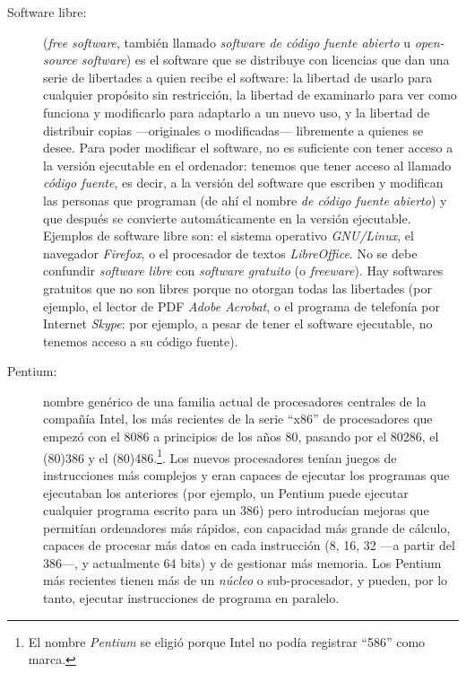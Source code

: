 \begin{description}
\item[Software libre:] (\emph{free software}, también llamado \emph{software de código fuente abierto} u \emph{open-source software}) es el software que se distribuye con licencias que dan una serie de libertades a quien recibe el software: la libertad de usarlo para cualquier propósito sin restricción, la libertad de examinarlo para ver como funciona y modificarlo para adaptarlo a un nuevo uso, y la libertad de distribuir copias ---originales o modificadas--- libremente a quienes se desee. Para poder modificar el software, no es suficiente con tener acceso a la versión ejecutable en el ordenador: tenemos que tener acceso al llamado \emph{código fuente}, es decir, a la versión del software que escriben y modifican las personas que programan (de ahí el nombre \emph{de código fuente abierto}) y que después se convierte automáticamente en la versión ejecutable. Ejemplos de software libre son: el sistema operativo \emph{GNU/Linux}, el navegador \emph{Firefox}, o el procesador de textos \emph{LibreOffice}. No se debe confundir \emph{software libre} con \emph{software gratuito} (o \emph{freeware}). Hay softwares gratuitos que no son libres porque no otorgan todas las libertades (por ejemplo, el lector de PDF \emph{Adobe Acrobat}, o el programa de telefonía por Internet \emph{Skype}: por ejemplo, a pesar de tener el software ejecutable, no tenemos acceso a su código fuente). 

\item[Pentium:] nombre genérico de una familia actual de procesadores centrales de la compañía Intel, los más recientes de la serie ``x86'' de procesadores que empezó con el 8086 a principios de los años 80, pasando por el 80286, el (80)386 y el (80)486.\footnote{El nombre \emph{Pentium} se eligió porque Intel no podía registrar ``586'' como marca.}. Los nuevos procesadores tenían juegos de instrucciones más complejos y eran capaces de ejecutar los programas que ejecutaban los anteriores (por ejemplo, un Pentium puede ejecutar cualquier programa escrito para un 386) pero introducían mejoras que permitían ordenadores más rápidos, con capacidad más grande de cálculo, capaces de procesar más datos en cada instrucción (8, 16, 32 ---a partir del 386---, y actualmente 64 bits) y de gestionar más memoria. Los Pentium más recientes tienen más de un \emph{núcleo} o sub-procesador, y pueden, por lo tanto, ejecutar instrucciones de programa en paralelo. 


\end{description}
